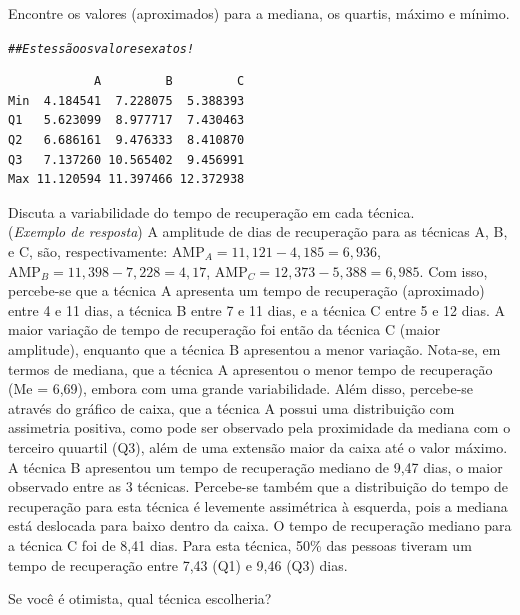 \documentclass[a4paper,11pt,fleqn]{article}\usepackage[]{graphicx}\usepackage[]{color}
\makeatletter
\newcommand{\hlcom}[1]{\textcolor[rgb]{0.4,0.4,0.4}{\textit{#1}}}%
\newenvironment{kframe}{%
 \def\at@end@of@kframe{}%
 \ifinner\ifhmode%
  \def\at@end@of@kframe{\end{minipage}}%
  \begin{minipage}{\columnwidth}%
 \fi\fi%
 \def\FrameCommand##1{\hskip\@totalleftmargin \hskip-\fboxsep
 \colorbox{shadecolor}{##1}\hskip-\fboxsep
     \hskip-\linewidth \hskip-\@totalleftmargin \hskip\columnwidth}%
 \MakeFramed {\advance\hsize-\width
   \@totalleftmargin\z@ \linewidth\hsize
   \@setminipage}}%
 {\par\unskip\endMakeFramed%
 \at@end@of@kframe}
\newenvironment{knitrout}{}{} %
\theoremstyle{definition}
\makeatother
\begin{document}
\begin{compactenum}[6.]
\begin{knitrout}
\end{knitrout}
\begin{compactenum}
\item Encontre os valores (aproximados) para a mediana, os quartis,
  máximo e mínimo.
\begin{knitrout}\small
{}\color{fgcolor}\begin{kframe}
\begin{alltt}
\hlcom{## Estes são os valores exatos!}
\end{alltt}
\begin{verbatim}
            A         B         C
Min  4.184541  7.228075  5.388393
Q1   5.623099  8.977717  7.430463
Q2   6.686161  9.476333  8.410870
Q3   7.137260 10.565402  9.456991
Max 11.120594 11.397466 12.372938
\end{verbatim}
\end{kframe}
\end{knitrout}
\item Discuta a variabilidade do tempo de recuperação em cada técnica. \\
  (\textit{Exemplo de resposta}) A amplitude de dias de recuperação para
  as técnicas A, B, e C, são, respectivamente: $\text{AMP}_{A} = 11,121
  - 4,185 = 6,936$, $\text{AMP}_{B} = 11,398 - 7,228 = 4,17$,
  $\text{AMP}_{C} = 12,373 - 5,388 = 6,985$. Com isso, percebe-se que a
  técnica A apresenta um tempo de recuperação (aproximado) entre 4 e 11
  dias, a técnica B entre 7 e 11 dias, e a técnica C entre 5 e 12
  dias. A maior variação de tempo de recuperação foi então da técnica C
  (maior amplitude), enquanto que a técnica B apresentou a menor
  variação. Nota-se, em termos de mediana, que a técnica A apresentou o
  menor tempo de recuperação (Me = 6,69), embora com uma grande
  variabilidade. Além disso, percebe-se através do gráfico de caixa, que
  a técnica A possui uma distribuição com assimetria positiva, como pode
  ser observado pela proximidade da mediana com o terceiro quuartil
  (Q3), além de uma extensão maior da caixa até o valor máximo. A
  técnica B apresentou um tempo de recuperação mediano de 9,47 dias, o
  maior observado entre as 3 técnicas. Percebe-se também que a
  distribuição do tempo de recuperação para esta técnica é levemente
  assimétrica à esquerda, pois a mediana está deslocada para baixo
  dentro da caixa. O tempo de recuperação mediano para a técnica C foi
  de 8,41 dias. Para esta técnica, 50\% das pessoas tiveram um tempo de
  recuperação entre 7,43 (Q1) e 9,46 (Q3) dias.
\item Se você é otimista, qual técnica escolheria?
\end{compactenum}
\end{compactenum}
\end{document}
